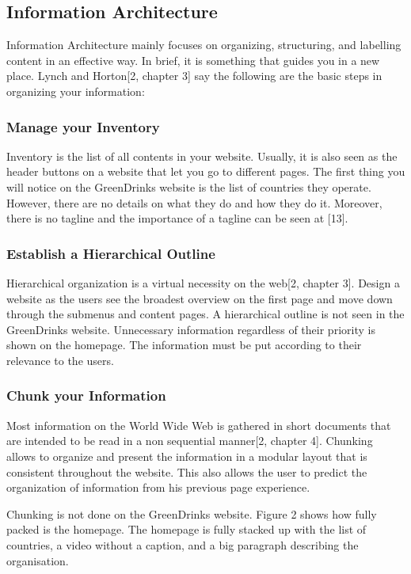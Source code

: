\documentclass[12pt]{article}
\begin{document}
\subsection*{Information Architecture} 
Information Architecture mainly focuses on organizing, structuring, and labelling content in an effective way. In brief, it is something that guides you in a new place. Lynch and Horton[2, chapter 3] say the following are the basic steps in organizing your information:
\subsubsection*{Manage your Inventory}
Inventory is the list of all contents in your website.  Usually, it is also seen as the header buttons on a website that let you go to different pages. The first thing you will notice on the GreenDrinks website is the list of countries they operate.  However, there are no details on what they do and how they do it. Moreover, there is no tagline and the importance of a tagline can be seen at [13]. 

\subsubsection*{Establish a Hierarchical Outline}
Hierarchical organization is a virtual necessity on the web[2, chapter 3]. Design a website as the users see the broadest overview on the first page and move down through the submenus and content pages.  A hierarchical outline is not seen in the GreenDrinks website. Unnecessary information regardless of their priority is shown on the homepage. The information must be put according to their relevance to the users.
 \subsubsection*{Chunk your Information}
Most information on the World Wide Web is gathered in short documents that are intended to be read in a non sequential manner[2, chapter 4]. Chunking allows to organize and present the information in a modular layout that is consistent throughout the website.  This also allows the user to predict the organization of information from his previous page experience. 

Chunking is not done on the GreenDrinks website.  Figure 2 shows how fully packed is the homepage. The homepage is fully stacked up with the list of countries, a video without a caption, and a big paragraph describing the organisation.
\end{document}
